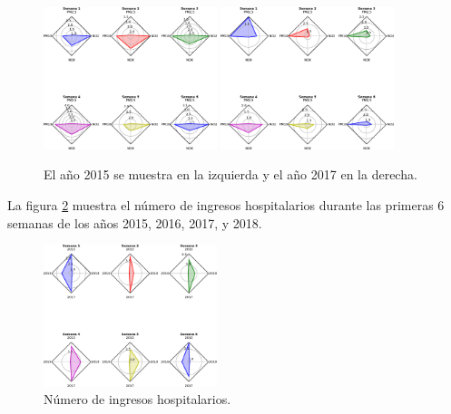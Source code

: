 \documentclass[a0]{sciposter} %
\begin{document}
\begin{multicols}{2}
\begin{figure}
\setcounter{figure}{1} %
\captionsetup{type=figure} %
\begin{center}
   \includegraphics[width=0.45\textwidth]{Contaminantes-2015.eps}
   \hspace{2cm}
   \includegraphics[width=0.45\textwidth]{Contaminantes-2017.eps}
   \end{center}
    \caption{El año 2015 se muestra en la izquierda y el año 2017 en la derecha.}
    \label{contaminantes}
\end{figure}

La figura \ref{ingresos} muestra el número de ingresos hospitalarios durante las primeras 6 semanas de los años 2015, 2016, 2017, y 2018.

\begin{figure}
\setcounter{figure}{2} %
\captionsetup{type=figure} %
\begin{center}
   \includegraphics[width=0.45\textwidth]{Ingresos-hospitalarios.eps}
   \end{center}
    \caption{Número de ingresos hospitalarios.}
    \label{ingresos}
\end{figure}



\end{multicols}
\end{document}
